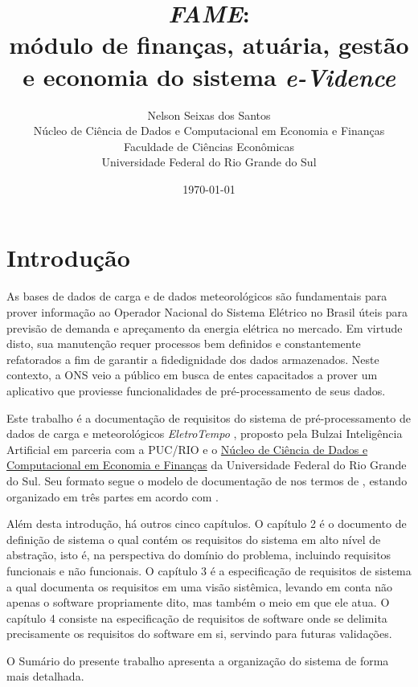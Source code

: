 \documentclass[a4paper, 12pt]{report}
\title{\textit{FAME}:\\ módulo de finanças, atuária, gestão e economia do sistema \textit{e-Vidence}}
\author{Nelson Seixas dos Santos  \\Núcleo de Ciência de Dados e Computacional em Economia e Finanças\\Faculdade de Ciências Econômicas\\Universidade Federal do Rio Grande do Sul}
\date{\today}
\begin{document}
\maketitle

\tableofcontents


\chapter{Introdução}
\begin{doublespace}


As bases de dados de carga e de dados meteorológicos são fundamentais para prover informação ao Operador Nacional do Sistema Elétrico no Brasil úteis para previsão de demanda e apreçamento da energia elétrica no mercado.  Em virtude disto, sua manutenção requer processos bem definidos e constantemente refatorados a fim de garantir a fidedignidade dos dados armazenados. Neste contexto, a ONS veio a público em busca de entes capacitados a prover um aplicativo que proviesse funcionalidades de pré-processamento de seus dados.

Este trabalho é a documentação de requisitos do sistema de pré-processamento de dados de carga e meteorológicos \textit{EletroTempo} \textsuperscript{\textregistered}, proposto pela Bulzai Inteligência Artificial em parceria com a PUC/RIO e o \href{www.ufrgs.br\/nfa}{Núcleo de Ciência de Dados e Computacional em Economia e Finanças} da Universidade Federal do Rio Grande do Sul.  Seu formato segue o modelo de documentação de  \cite{sommerville2011} nos termos de \cite{IeeeSRS720574}, estando organizado em três partes em acordo com \cite{swebok2014}.

Além desta introdução, há outros cinco capítulos.  O capítulo 2 é o documento de definição de sistema o qual contém os requisitos do sistema em alto nível de abstração, isto é, na perspectiva do domínio do problema, incluindo requisitos funcionais e não funcionais. O capítulo 3 é a especificação de requisitos de sistema a qual documenta os requisitos em uma visão sistêmica, levando em conta não apenas o software propriamente dito, mas também o meio em que ele atua.  O capítulo 4 consiste na especificação de requisitos de software onde se delimita precisamente os requisitos do software em si, servindo para futuras validações.

O Sumário do presente trabalho apresenta a organização do sistema de forma mais detalhada.

\end{doublespace}
\end{document}
